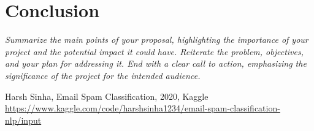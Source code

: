 \documentclass[conference]{IEEEtran}
\begin{document}
\section{Conclusion}
\textit{Summarize the main points of your proposal, highlighting the importance of your project and the potential impact it could have. Reiterate the problem, objectives, and your plan for addressing it. End with a clear call to action, emphasizing the significance of the project for the intended audience.}

\begin{thebibliography}{00}
 Harsh Sinha, Email Spam Classification, 2020, Kaggle\\{\tiny\href{https://www.kaggle.com/code/harshsinha1234/email-spam-classification-nlp/input}{https://www.kaggle.com/code/harshsinha1234/email-spam-classification-nlp/input}}
\end{thebibliography}
\end{document}
